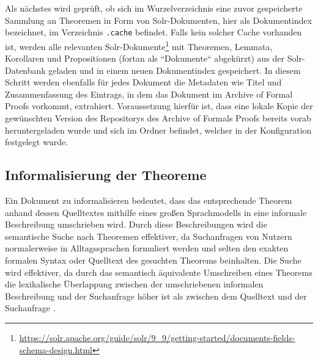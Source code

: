 \documentclass[12pt,letterpaper]{article} %
\begin{document}
Als nächstes wird geprüft, ob sich im Wurzelverzeichnis eine zuvor gespeicherte Sammlung an Theoremen in Form von Solr-Dokumenten, hier als Dokumentindex bezeichnet, im Verzeichnis \texttt{.cache} befindet.
Falls kein solcher Cache vorhanden ist, werden alle relevanten Solr-Dokumente\footnote{\url{https://solr.apache.org/guide/solr/9_9/getting-started/documents-fields-schema-design.html}} mit Theoremen, Lemmata, Korollaren und Propositionen (fortan als ``Dokumente`` abgekürzt) aus der Solr-Datenbank geladen und in einem neuen Dokumentindex gespeichert.
In diesem Schritt werden ebenfalls für jedes Dokument die Metadaten wie Titel und Zusammenfassung des Eintrags, in dem das Dokument im Archive of Formal Proofs vorkommt, extrahiert.
Voraussetzung hierfür ist, dass eine lokale Kopie der gewünschten Version des Repositorys des Archive of Formals Proofs bereits vorab heruntergeladen wurde und sich im Ordner befindet, welcher in der Konfiguration festgelegt wurde.

\subsection{Informalisierung der Theoreme}
\label{sec:informalisierung}
Ein Dokument zu informalisieren bedeutet, dass das entsprechende Theorem anhand dessen Quelltextes mithilfe eines großen Sprachmodells in eine informale Beschreibung umschrieben wird.
Durch diese Beschreibungen wird die semantische Suche nach Theoremen effektiver, da Suchanfragen von Nutzern normalerweise in Alltagssprachen formuliert werden und selten den exakten formalen Syntax oder Quelltext des gesuchten Theorems beinhalten.
Die Suche wird effektiver, da durch das semantisch äquivalente Umschreiben eines Theorems die lexikalische Überlappung zwischen der umschriebenen informalen Beschreibung und der Suchanfrage höher ist als zwischen dem Quelltext und der Suchanfrage \citep[S. 1]{jagerman_query_2023}.
\end{document}

